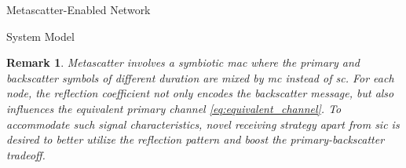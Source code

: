 \documentclass[journal]{IEEEtran}
\newtheorem{remark}{Remark}
\begin{document}
\begin{section}{Metascatter-Enabled Network}
\begin{subsection}{System Model}


		\begin{remark}
			Metascatter involves a symbiotic \gls{mac} where the primary and backscatter symbols of different duration are mixed by \gls{mc} instead of \gls{sc}.
			For each node, the reflection coefficient not only encodes the backscatter message, but also influences the equivalent primary channel \eqref{eq:equivalent_channel}.
			To accommodate such signal characteristics, novel receiving strategy apart from \gls{sic} is desired to better utilize the reflection pattern and boost the primary-backscatter tradeoff.
		\end{remark}
	\end{subsection}


\end{section}
\end{document}
